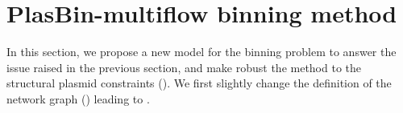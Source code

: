\section{PlasBin-multiflow binning method}\label{sec:pbmf}

In this section, we propose a new model for the binning problem to answer the issue raised in the previous section, and make robust the method to the structural plasmid constraints ().
We first slightly change the definition of the network graph () leading to .


